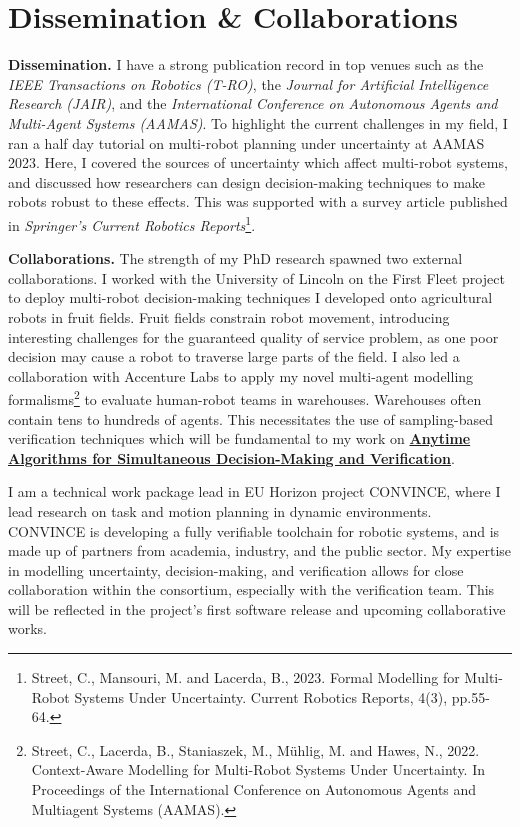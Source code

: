 \documentclass[12pt]{article}
\newcommand{\anytime}{\hyperlink{topicthree}{\textbf{Anytime Algorithms for Simultaneous Decision-Making and Verification}}}
\begin{document}
\section*{Dissemination \& Collaborations}

\vspace*{1ex}\noindent\textbf{Dissemination.} I have a strong publication record in top venues such as the \emph{IEEE Transactions on Robotics (T-RO)}, the \emph{Journal for Artificial Intelligence Research (JAIR)}, and the \emph{International Conference on Autonomous Agents and Multi-Agent Systems (AAMAS)}.
%
To highlight the current challenges in my field, I ran a half day tutorial on multi-robot planning under uncertainty at AAMAS 2023.
%
Here, I covered the sources of uncertainty which affect multi-robot systems, and discussed how researchers can design decision-making techniques to make robots robust to these effects.
%
This was supported with a survey article published in \emph{Springer's Current Robotics Reports}\footnote{Street, C., Mansouri, M. and Lacerda, B., 2023. Formal Modelling for Multi-Robot Systems Under Uncertainty. Current Robotics Reports, 4(3), pp.55-64.}.

\vspace*{1ex}\noindent\textbf{Collaborations.} The strength of my PhD research spawned two external collaborations.
%
I worked with the University of Lincoln on the First Fleet project to deploy multi-robot decision-making techniques I developed onto agricultural robots in fruit fields.
%
Fruit fields constrain robot movement, introducing interesting challenges for the guaranteed quality of service problem, as one poor decision may cause a robot to traverse large parts of the field.
%
I also led a collaboration with Accenture Labs to apply my novel multi-agent modelling formalisms\footnote{Street, C., Lacerda, B., Staniaszek, M., Mühlig, M. and Hawes, N., 2022. Context-Aware Modelling for Multi-Robot Systems Under Uncertainty. In Proceedings of the International Conference on Autonomous Agents
and Multiagent Systems (AAMAS).} to evaluate human-robot teams in warehouses.
%
Warehouses often contain tens to hundreds of agents.
%
This necessitates the use of sampling-based verification techniques which will be fundamental to my work on \anytime. 


I am a technical work package lead in EU Horizon project CONVINCE, where I lead research on task and motion planning in dynamic environments.
%
CONVINCE is developing a fully verifiable toolchain for robotic systems, and is made up of partners from academia, industry, and the public sector.
%
My expertise in modelling uncertainty, decision-making, and verification allows for close collaboration within the consortium, especially with the verification team.
%
This will be reflected in the project's first software release and upcoming collaborative works.
\end{document}
